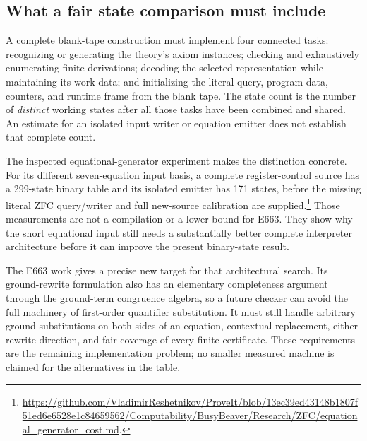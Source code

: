 \subsection{What a fair state comparison must include}

A complete blank-tape construction must implement four connected tasks:
recognizing or generating the theory's axiom instances; checking and
exhaustively enumerating finite derivations; decoding the selected
representation while maintaining its work data; and initializing the
literal query, program data, counters, and runtime frame from the blank
tape.  The state count is the number of \emph{distinct} working states
after all those tasks have been combined and shared.  An estimate for
an isolated input writer or equation emitter does not establish that
complete count.

The inspected equational-generator experiment makes the distinction
concrete.  For its different seven-equation input basis, a complete
register-control source has a 299-state binary table and its isolated
emitter has 171 states, before the missing literal ZFC query/writer
and full new-source calibration are supplied.\footnote{
\url{https://github.com/VladimirReshetnikov/ProveIt/blob/13ec39ed43148b1807f51ed6e6528e1c84659562/Computability/BusyBeaver/Research/ZFC/equational_generator_cost.md}.}
Those measurements are not a compilation or a lower bound for E663.
They show why the short equational input still needs a substantially
better complete interpreter architecture before it can improve the
present binary-state result.

The E663 work gives a precise new target for that architectural search.
Its ground-rewrite formulation also has an elementary completeness
argument through the ground-term congruence algebra, so a future checker
can avoid the full machinery of first-order quantifier substitution.
It must still handle arbitrary ground substitutions on both sides of
an equation, contextual replacement, either rewrite direction, and fair
coverage of every finite certificate.  These requirements are the
remaining implementation problem; no smaller measured machine is
claimed for the alternatives in the table.
